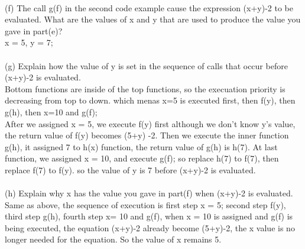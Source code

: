 \documentclass[12pt]{article}
\begin{document}
\vspace{1mm}\\
(f) The call g(f) in the second code example cause the expression (x+y)-2 to be evaluated. What are the values of x and y that are used to produce the value you gave in part(e)?\\
x = 5, y = 7;\\
\vspace{1mm}\\
(g) Explain how the value of y is set in the sequence of calls that occur before (x+y)-2 is evaluated.\\
Bottom functions are inside of the top functions, so the execuation priority is decreasing from top to down. which menas x=5 is executed first, then f(y), then g(h), then x=10 and g(f);\\
After we assigned x = 5, we execute f(y) first although we don't know y's value, the return value of f(y) becomes (5+y) -2. Then we execute the inner function g(h), it assigned 7 to h(x) function, the return value of g(h) is h(7). At last function, we assigned x = 10, and execute g(f); so replace h(7) to f(7), then replace f(7) to f(y). so the value of y is 7 before (x+y)-2 is evaluated.\\
\vspace{1mm}\\
(h) Explain why x has the value you gave in part(f) when (x+y)-2 is evaluated.\\
Same as above, the sequence of execution is first step x = 5; second step f(y), third step g(h), fourth step x= 10 and g(f), when x = 10 is assigned and g(f) is being executed, the equation (x+y)-2 already become (5+y)-2, the x value is no longer needed for the equation. So the value of x remains 5.
\end{document}
